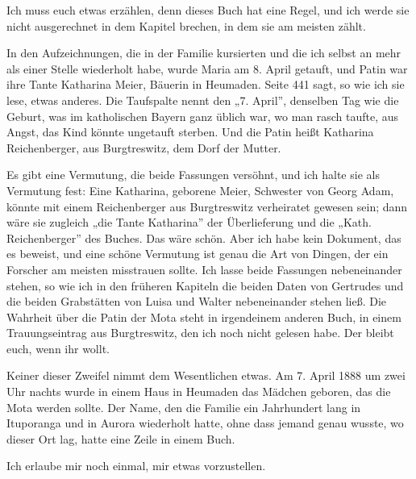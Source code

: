 \documentclass[
  ngerman,
  11pt,
  openany]{book}
\begin{document}
Ich muss euch etwas erzählen, denn dieses Buch hat eine Regel, und ich
werde sie nicht ausgerechnet in dem Kapitel brechen, in dem sie am
meisten zählt.

In den Aufzeichnungen, die in der Familie kursierten und die ich selbst
an mehr als einer Stelle wiederholt habe, wurde Maria am 8. April
getauft, und Patin war ihre Tante Katharina Meier, Bäuerin in Heumaden.
Seite 441 sagt, so wie ich sie lese, etwas anderes. Die Taufspalte nennt
den „7. April'', denselben Tag wie die Geburt, was im katholischen
Bayern ganz üblich war, wo man rasch taufte, aus Angst, das Kind könnte
ungetauft sterben. Und die Patin heißt Katharina Reichenberger, aus
Burgtreswitz, dem Dorf der Mutter.

Es gibt eine Vermutung, die beide Fassungen versöhnt, und ich halte sie
als Vermutung fest: Eine Katharina, geborene Meier, Schwester von Georg
Adam, könnte mit einem Reichenberger aus Burgtreswitz verheiratet
gewesen sein; dann wäre sie zugleich „die Tante Katharina'' der
Überlieferung und die „Kath. Reichenberger'' des Buches. Das wäre schön.
Aber ich habe kein Dokument, das es beweist, und eine schöne Vermutung
ist genau die Art von Dingen, der ein Forscher am meisten misstrauen
sollte. Ich lasse beide Fassungen nebeneinander stehen, so wie ich in
den früheren Kapiteln die beiden Daten von Gertrudes und die beiden
Grabstätten von Luisa und Walter nebeneinander stehen ließ. Die Wahrheit
über die Patin der Mota steht in irgendeinem anderen Buch, in einem
Trauungseintrag aus Burgtreswitz, den ich noch nicht gelesen habe. Der
bleibt euch, wenn ihr wollt.

Keiner dieser Zweifel nimmt dem Wesentlichen etwas. Am 7. April 1888 um
zwei Uhr nachts wurde in einem Haus in Heumaden das Mädchen geboren, das
die Mota werden sollte. Der Name, den die Familie ein Jahrhundert lang
in Ituporanga und in Aurora wiederholt hatte, ohne dass jemand genau
wusste, wo dieser Ort lag, hatte eine Zeile in einem Buch.

Ich erlaube mir noch einmal, mir etwas vorzustellen.
\end{document}
